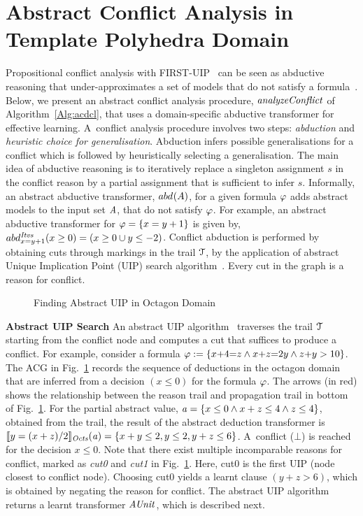 \section{Abstract Conflict Analysis in Template Polyhedra Domain}\label{sec:conflict}
%
Propositional conflict analysis with FIRST-UIP~\cite{cdcl} can be seen 
as abductive reasoning that under-approximates a 
set of models that do not satisfy a formula~\cite{sas12,dhk2013-popl}.  
Below, we present an abstract conflict analysis procedure, $\mathit{analyzeConflict}$ of 
Algorithm~\ref{Alg:acdcl}, that uses a 
domain-specific abductive transformer for effective learning. 
A~conflict analysis procedure involves two steps: {\em abduction} 
and {\em heuristic choice for generalisation}. Abduction infers 
possible generalisations for a conflict which is followed by 
heuristically selecting a generalisation.  The main idea of abductive reasoning is to 
iteratively replace a singleton assignment $s$ in the conflict 
reason by a partial assignment that is sufficient to infer $s$.  
Informally, an abstract abductive transformer, $abd_{}^{}(A)$, 
for a given formula $\varphi$ adds abstract models to the input set
$\mathit{A}$, that do not satisfy $\varphi$. 
%
For example, an abstract abductive transformer for $\varphi=\{x=y+1\}$ 
is given by, $abd_{x=y+1}^{\mathit{Itvs}}(x \geq 0)=(x \geq 0 \cup y \leq -2)$.
%
Conflict abduction is performed by obtaining cuts through markings in the 
trail $\mathcal{T}$, by the application of abstract Unique Implication Point (UIP) 
search algorithm~\cite{cdcl}.  Every cut in the graph is a reason for
conflict.\\ 
%
\begin{figure}[t]
\centering
{}
\caption{\label{uip} Finding Abstract UIP in Octagon Domain}
\end{figure}  
%


\noindent \textbf{Abstract UIP Search}
An abstract UIP algorithm~\cite{DBLP:journals/fmsd/BrainDGHK14} 
traverses the trail $\mathcal{T}$ starting from the conflict node and 
computes a cut that suffices to produce a conflict.  
For example, consider a formula $\varphi:= \{x{+}4{=}z \wedge 
x{+}z{=}2y \wedge z{+}y>10\}$.  The ACG in Fig.~\ref{uip} records the 
sequence of deductions in the octagon domain that are inferred from 
a decision $(x{\leq}0)$ for the formula $\varphi$.  The arrows (in red) 
shows the relationship between the reason trail and propagation trail in 
bottom of Fig.~\ref{uip}.  For the partial abstract value, 
$\mathit{a}=\{x\leq0 \wedge x+z\leq4 \wedge z\leq4\}$, 
obtained from the trail, the result of the abstract deduction transformer is
$\llbracket y=(x+z)/2 \rrbracket_{\mathit{Octs}}(\mathit{a})=\{x+y\leq2, y\leq2, y+z\leq6\}$.
A~conflict ($\bot$) is reached for the decision ${x{\leq}0}$.   
Note that there exist multiple incomparable reasons for conflict,
marked as {\em cut0} and {\em cut1} in Fig.~\ref{uip}.  Here, cut0 is 
the first UIP (node closest to conflict node).  Choosing cut0 yields 
a learnt clause $(y+z>6)$, which is obtained by 
negating the reason for conflict.  The abstract UIP algorithm returns a learnt 
transformer $\mathit{AUnit}$, which is described next.\\ 
%    


